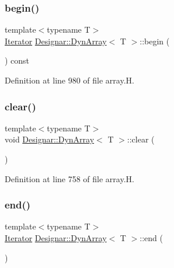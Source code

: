 \subsubsection{\texorpdfstring{begin()}{begin()}\hspace{0.1cm}{\footnotesize\ttfamily [2/2]}}
{\footnotesize\ttfamily template$<$typename T$>$ \\
\hyperlink{class_designar_1_1_dyn_array_1_1_iterator}{Iterator} \hyperlink{class_designar_1_1_dyn_array}{Designar\+::\+Dyn\+Array}$<$ T $>$\+::begin (\begin{DoxyParamCaption}{ }\end{DoxyParamCaption}) const\hspace{0.3cm}{\ttfamily [inline]}}



Definition at line 980 of file array.\+H.

\mbox{\label{class_designar_1_1_dyn_array_abea6b41f8373dc60753255f3c390507f}} 
\subsubsection{\texorpdfstring{clear()}{clear()}}
{\footnotesize\ttfamily template$<$typename T$>$ \\
void \hyperlink{class_designar_1_1_dyn_array}{Designar\+::\+Dyn\+Array}$<$ T $>$\+::clear (\begin{DoxyParamCaption}{ }\end{DoxyParamCaption})\hspace{0.3cm}{\ttfamily [inline]}}



Definition at line 758 of file array.\+H.

\mbox{\label{class_designar_1_1_dyn_array_a1a6bfcf9c4cd8d54138339b9313661f3}} 
\subsubsection{\texorpdfstring{end()}{end()}\hspace{0.1cm}{\footnotesize\ttfamily [1/2]}}
{\footnotesize\ttfamily template$<$typename T$>$ \\
\hyperlink{class_designar_1_1_dyn_array_1_1_iterator}{Iterator} \hyperlink{class_designar_1_1_dyn_array}{Designar\+::\+Dyn\+Array}$<$ T $>$\+::end (\begin{DoxyParamCaption}{ }\end{DoxyParamCaption})\hspace{0.3cm}{\ttfamily [inline]}}



